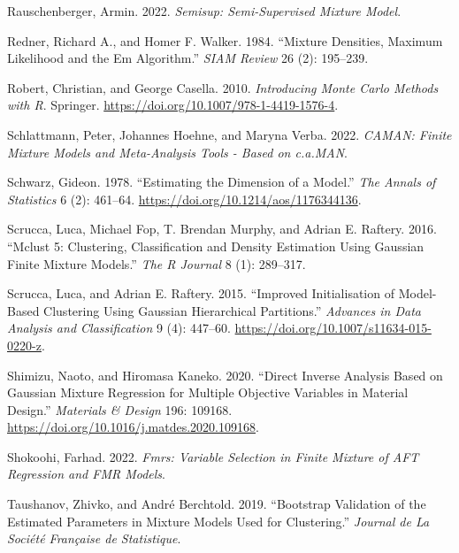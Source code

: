 \begin{CSLReferences}{1}{0}
\leavevmode{}%
Rauschenberger, Armin. 2022. \emph{Semisup: Semi-Supervised Mixture Model}.

\leavevmode{}%
Redner, Richard A., and Homer F. Walker. 1984. {``Mixture {Densities}, {Maximum Likelihood} and the {Em Algorithm}.''} \emph{SIAM Review} 26 (2): 195--239.

\leavevmode{}%
Robert, Christian, and George Casella. 2010. \emph{Introducing {Monte Carlo Methods} with {R}}. {Springer}. \url{https://doi.org/10.1007/978-1-4419-1576-4}.

\leavevmode{}%
Schlattmann, Peter, Johannes Hoehne, and Maryna Verba. 2022. \emph{CAMAN: Finite Mixture Models and Meta-Analysis Tools - Based on c.a.MAN}.

\leavevmode{}%
Schwarz, Gideon. 1978. {``Estimating the {Dimension} of a {Model}.''} \emph{The Annals of Statistics} 6 (2): 461--64. \url{https://doi.org/10.1214/aos/1176344136}.

\leavevmode{}%
Scrucca, Luca, Michael Fop, T. Brendan Murphy, and Adrian E. Raftery. 2016. {``Mclust 5: {Clustering}, {Classification} and {Density Estimation Using Gaussian Finite Mixture Models}.''} \emph{The R Journal} 8 (1): 289--317.

\leavevmode{}%
Scrucca, Luca, and Adrian E. Raftery. 2015. {``Improved Initialisation of Model-Based Clustering Using {Gaussian} Hierarchical Partitions.''} \emph{Advances in Data Analysis and Classification} 9 (4): 447--60. \url{https://doi.org/10.1007/s11634-015-0220-z}.

\leavevmode{}%
Shimizu, Naoto, and Hiromasa Kaneko. 2020. {``Direct Inverse Analysis Based on {Gaussian} Mixture Regression for Multiple Objective Variables in Material Design.''} \emph{Materials \& Design} 196: 109168. \url{https://doi.org/10.1016/j.matdes.2020.109168}.

\leavevmode{}%
Shokoohi, Farhad. 2022. \emph{Fmrs: Variable Selection in Finite Mixture of AFT Regression and FMR Models}.

\leavevmode{}%
Taushanov, Zhivko, and André Berchtold. 2019. {``Bootstrap Validation of the Estimated Parameters in Mixture Models Used for Clustering.''} \emph{Journal de La Société Française de Statistique}.


\end{CSLReferences}

